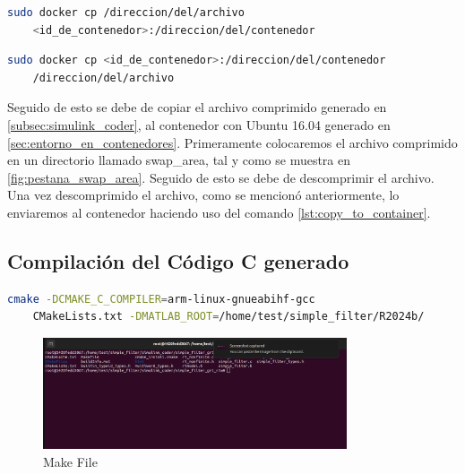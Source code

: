 \begin{lstlisting}[language=bash, caption={Copiar archivos al contenedor, Linux}, label=lst:copy_to_container]
    sudo docker cp /direccion/del/archivo 
    <id_de_contenedor>:/direccion/del/contenedor
\end{lstlisting}

\begin{lstlisting}[language=bash, caption={Copiar archivos del contenedor, Linux}, label=lst:copy_from_container]
    sudo docker cp <id_de_contenedor>:/direccion/del/contenedor
    /direccion/del/archivo
\end{lstlisting}

Seguido de esto se debe de copiar el archivo comprimido generado en \ref{subsec:simulink_coder}, al contenedor con Ubuntu 16.04 generado en \ref{sec:entorno_en_contenedores}. Primeramente colocaremos el archivo comprimido en un directorio llamado swap\_area, tal y como se muestra en \ref{fig:pestana_swap_area}. Seguido de esto se debe de descomprimir el archivo. Una vez descomprimido el archivo, como se mencionó anteriormente, lo enviaremos al contenedor haciendo uso del comando \ref{lst:copy_to_container}.

\subsection{Compilación del Código C generado}\label{subsec:compilacion_binario}

\begin{lstlisting}[language=bash, caption={Compilacion del programa, Linux}, label=lst:build_cmake_file]
    cmake -DCMAKE_C_COMPILER=arm-linux-gnueabihf-gcc 
    CMakeLists.txt -DMATLAB_ROOT=/home/test/simple_filter/R2024b/
\end{lstlisting}

\begin{figure}[h!]
    \centering
    \includegraphics[width=0.8\textwidth]{fig/especifico_2/M2MT/paso_a_paso_mtmt/cmake_file.png}
    \caption{Make File}
    \label{fig:make_file}
\end{figure}


